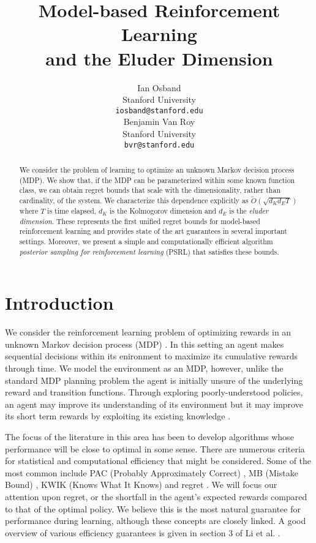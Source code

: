\documentclass{article}
\title{Model-based Reinforcement Learning \\ and the Eluder Dimension}
\author{Ian Osband \\
Stanford University \\
\texttt{iosband@stanford.edu} \\
\And
Benjamin Van Roy \\
Stanford University \\
\texttt{bvr@stanford.edu}}
\begin{document}
\maketitle


\begin{abstract}
We consider the problem of learning to optimize an unknown Markov decision process (MDP).
We show that, if the MDP can be parameterized within some known function class, we can obtain regret bounds that scale with the dimensionality, rather than cardinality, of the system.
We characterize this dependence explicitly as $\tilde{O}(\sqrt{d_K d_E T})$ where $T$ is time elapsed, $d_K$ is the Kolmogorov dimension and $d_E$ is the \emph{eluder dimension}.
These represents the first unified regret bounds for model-based reinforcement learning and provides state of the art guarantees in several important settings.
Moreover, we present a simple and computationally efficient algorithm \emph{posterior sampling for reinforcement learning} (PSRL) that satisfies these bounds.

\end{abstract}


\section{Introduction}

We consider the reinforcement learning problem of optimizing rewards in an unknown Markov decision process (MDP) \cite{burnetas1997optimal}.
In this setting an agent makes sequential decisions within its enironment to maximize its cumulative rewards through time.
We model the environment as an MDP, however, unlike the standard MDP planning problem the agent is initially unsure of the underlying reward and transition functions.
Through exploring poorly-understood policies, an agent may improve its understanding of its environment but it may improve its short term rewards by exploiting its existing knowledge \cite{lai1985asymptotically,kaelbling1996reinforcement}.

The focus of the literature in this area has been to develop algorithms whose performance will be close to optimal in some sense.
There are numerous criteria for statistical and computational efficiency that might be considered.
Some of the most common include PAC (Probably Approximately Correct) \cite{valiant1984theory}, MB (Mistake Bound) \cite{littlestone1988learning}, KWIK (Knows What It Knows) \cite{li2011knows} and regret \cite{jaksch2010near}.
We will focus our attention upon regret, or the shortfall in the agent's expected rewards compared to that of the optimal policy.
We believe this is the most natural guarantee for performance during learning, although these concepts are closely linked.
A good overview of various efficiency guarantees is given in section 3 of Li et al. \cite{li2011knows}.
\end{document}

